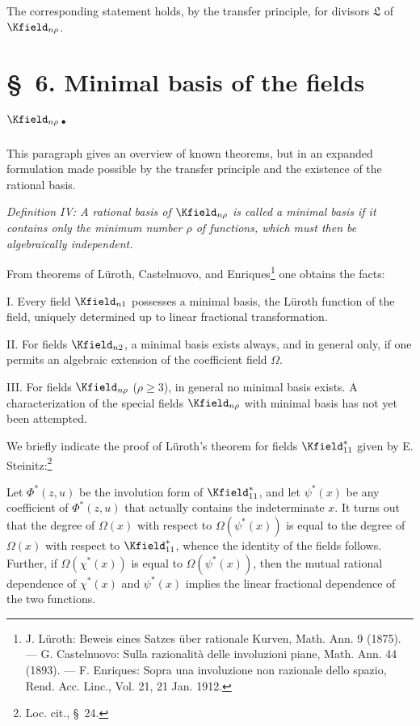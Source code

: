 \documentclass[11pt]{article}
\begin{document}
The corresponding statement holds, by the transfer principle, for divisors $\mathfrak{L}$ of $\Kfield_{n\rho}$.

\section*{\S\ 6. Minimal basis of the fields $\Kfield_{n\rho}$.}

This paragraph gives an overview of known theorems, but in an expanded formulation made possible by the transfer principle and the existence of the rational basis.

\emph{Definition IV: A rational basis of $\Kfield_{n\rho}$ is called a minimal basis if it contains only the minimum number $\rho$ of functions, which must then be algebraically independent.}

From theorems of Lüroth, Castelnuovo, and Enriques\footnote{J. Lüroth: Beweis eines Satzes über rationale Kurven, Math. Ann. 9 (1875). --- G. Castelnuovo: Sulla razionalità delle involuzioni piane, Math. Ann. 44 (1893). --- F. Enriques: Sopra una involuzione non razionale dello spazio, Rend. Acc. Linc., Vol. 21, 21 Jan. 1912.} one obtains the facts:

I. Every field $\Kfield_{n1}$ possesses a minimal basis, the Lüroth function of the field, uniquely determined up to linear fractional transformation.

II. For fields $\Kfield_{n2}$, a minimal basis exists always, and in general only, if one permits an algebraic extension of the coefficient field $\Omega$.

III. For fields $\Kfield_{n\rho}$ ($\rho\ge3$), in general no minimal basis exists. A characterization of the special fields $\Kfield_{n\rho}$ with minimal basis has not yet been attempted.

We briefly indicate the proof of Lüroth's theorem for fields $\Kfield^*_{11}$ given by E. Steinitz:\footnote{Loc. cit., \S\ 24.}

Let $\Phi^*(z,u)$ be the involution form of $\Kfield^*_{11}$, and let $\psi^*(x)$ be any coefficient of $\Phi^*(z,u)$ that actually contains the indeterminate $x$. It turns out that the degree of $\Omega(x)$ with respect to $\Omega(\psi^*(x))$ is equal to the degree of $\Omega(x)$ with respect to $\Kfield^*_{11}$, whence the identity of the fields follows. Further, if $\Omega(\chi^*(x))$ is equal to $\Omega(\psi^*(x))$, then the mutual rational dependence of $\chi^*(x)$ and $\psi^*(x)$ implies the linear fractional dependence of the two functions.
\end{document}
